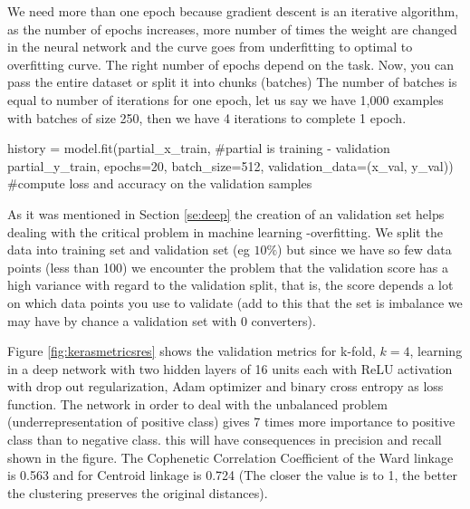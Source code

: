 \documentclass[11pt]{article}
\theoremstyle{definition}
\theoremstyle{remark}
\begin{document}
We need more than one epoch because gradient descent is an iterative algorithm, as the number of epochs increases, more number of times the weight are changed in the neural network and the curve goes from underfitting to optimal to overfitting curve. The right number of epochs depend on the task. Now, you can pass the entire dataset or split it into chunks (batches)
The number of batches is equal to number of iterations for one epoch, let us say we have 1,000 examples with batches of size 250, then we have 4 iterations to complete 1 epoch.

\begin{code}[caption=fitting deep network, label=deepkerasfit]
history = model.fit(partial_x_train, #partial is training - validation
                    partial_y_train, 
                    epochs=20,
                    batch_size=512,
                    validation_data=(x_val, y_val)) 
                    #compute loss and accuracy on the validation samples
\end{code}

As it was mentioned in Section \ref{se:deep} the creation of an validation set helps dealing with the critical problem in machine learning -overfitting. We split the data into training set and validation set (eg $10\%$) but since we have so few data points (less than 100) we encounter the problem that the validation score has a high variance with regard to the validation split, that is, the score depends a lot on which data points you use to validate (add to this that the set is imbalance we may have by chance a validation set with 0 converters).

Figure \ref{fig:kerasmetricsres} shows the validation metrics for k-fold, $k=4$, learning in a deep network with two hidden layers of 16 units each with ReLU activation with drop out regularization, Adam optimizer and binary cross entropy as loss function. The network in order to deal with the unbalanced problem (underrepresentation of positive class) gives 7 times more importance to positive class than to negative class. this will have consequences in precision and recall shown in the figure. The Cophenetic Correlation Coefficient of the Ward linkage is 0.563 and for Centroid linkage is 0.724 (The closer the value is to 1, the better the clustering preserves the original distances).
\end{document}
